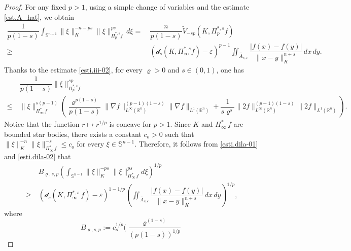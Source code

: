 \documentclass[11pt, reqno]{article}
\theoremstyle{definition}
\numberwithin{equation}{section}
\newcommand{\R}{\mathbb{R}}
\newcommand{\Sphere}{\mathbb{S}^{n - 1}}
\newcommand{\dila}{\mathscr{d}}
\begin{document}
\begin{proof}
\medskip

For any fixed $p > 1$, using a simple change of variables and the estimate \eqref{est.A_hat}, we obtain
	\begin{equation}\label{esti.dila-01}
		\begin{split}
		\dfrac{1}{p(1 - s)}\int_{\Sphere} \| \xi \|_K^{-n - ps} \| \xi \|^{ps}_{\Pi^{\ast, s}_p f} \, d\xi = & ~ \dfrac{n}{p(1 - s)} \widetilde V_{-sp}(K, \Pi^{\ast, s}_p f) \\
		\geq & ~ 
		\left( \dila_s(K, \Pi^{\ast, s}_\infty  f) - \varepsilon \right)^{p - 1} 
		\iint_{\widehat A_{s, \varepsilon}} 
		\dfrac{|f(x) - f(y)|}{\| x - y \|_K^{n + s}} \, dx \, dy.
		\end{split}
	\end{equation}
Thanks to the estimate \eqref{esti.iii-02}, for every $\varrho > 0$ and $s \in (0, 1)$, one has
	\begin{equation}\label{esti.dila-02}
    \begin{split}
		& ~ \dfrac{1}{p(1 - s)}\| \xi \|^{sp}_{\Pi^{\ast, s}_p f} \\
		\leq & ~ 
        \| \xi \|_{\Pi^\ast_\infty \, f}^{s(p - 1)} 
		\left(
		\dfrac{\varrho^{p(1 - s)}}{p(1 - s)} \| \nabla f \|^{(p - 1)(1 - s)}_{L^\infty(\R^n)} \| \nabla f \|_{L^1(\R^n)} 
		+
		\dfrac{1}{s \varrho^s} \| 2f \|^{(p - 1)(1 - s)}_{L^\infty(\R^n)} \| 2f \|_{L^1(\R^n)} 
		\right).
    \end{split}
	\end{equation}
Notice that the function $r \mapsto r^{1/p}$ is concave for $p > 1$.
Since $K$ and $\Pi^{\ast}_\infty \, f$ are bounded star bodies, there exists a constant $c_o > 0$ such that $\| \xi \|_K^{-n} \| \xi \|^{-s}_{\Pi^{\ast}_\infty \, f} \leq c_o$ for every $\xi \in  \Sphere$.
Therefore, it follows from \eqref{esti.dila-01} and \eqref{esti.dila-02} that
	\begin{equation}
		\begin{split}
		&~ B_{\varrho, s, p} \left( \int_{\Sphere} \| \xi \|_K^{-ps} \| \xi \|^{ps}_{\Pi^\ast_\infty \, f} d\xi \right)^{1/p} \\
		\geq & ~ 
		\left( \dila_s(K, \Pi^{\ast, s}_\infty  \, f) - \varepsilon \right)^{1 - 1/p} 
		\left(  
			\iint_{\widehat A_{s, \varepsilon}} 
		\dfrac{|f(x) - f(y)|}{\| x - y \|_K^{n + s}} \, dx \, dy
		\right)^{1/p},
		\end{split}
	\end{equation}
where
	\[
		B_{\varrho, s, p}  := c_o^{1/p} 
		\Bigg(  
			\dfrac{\varrho^{(1 - s)}}{(p(1 - s))^{1/p}}
\]
\end{proof}
\end{document}
